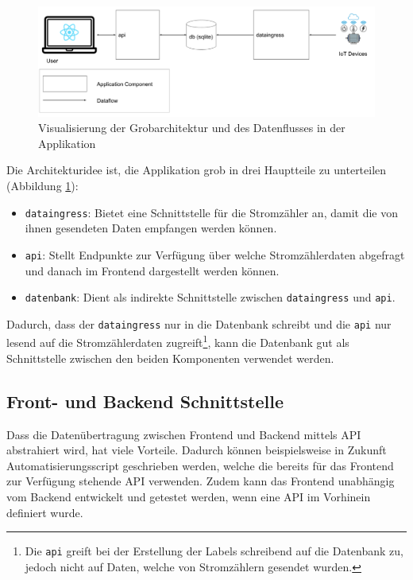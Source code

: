 \begin{figure}[h]
    \centering
    \includegraphics[width=\textwidth]{gfx/scmic-high-level-arch}
    \caption{
        Visualisierung der Grobarchitektur und des Datenflusses in der Applikation
    }
    \label{fig:high-level-arch}
\end{figure}

Die Architekturidee ist, die Applikation grob in drei Hauptteile zu unterteilen (Abbildung \ref{fig:high-level-arch}):

\begin{itemize}
    \item \texttt{dataingress}: Bietet eine Schnittstelle für die Stromzähler an, damit die von ihnen gesendeten Daten
          empfangen werden können.
    \item \texttt{api}: Stellt Endpunkte zur Verfügung über welche Stromzählerdaten abgefragt und
          danach im Frontend dargestellt werden können.
    \item \texttt{datenbank}: Dient als indirekte Schnittstelle zwischen \texttt{dataingress} und \texttt{api}.
\end{itemize}

Dadurch, dass der \texttt{dataingress} nur in die Datenbank schreibt und die \texttt{api} nur lesend auf die Stromzählerdaten zugreift\footnote{
    Die \texttt{api} greift bei der Erstellung der Labels schreibend auf die Datenbank zu,
    jedoch nicht auf Daten, welche von Stromzählern gesendet wurden.
},
kann die Datenbank gut als Schnittstelle zwischen den beiden Komponenten verwendet werden.

\subsection{Front- und Backend Schnittstelle}

Dass die Datenübertragung zwischen Frontend und Backend mittels \ac{API} abstrahiert
wird, hat viele Vorteile.
Dadurch können beispielsweise in Zukunft Automatisierungsscript geschrieben werden,
welche die bereits für das Frontend zur Verfügung stehende \ac{API} verwenden.
Zudem kann das Frontend unabhängig vom Backend entwickelt und getestet werden,
wenn eine \ac{API} im Vorhinein definiert wurde.

